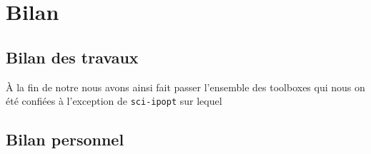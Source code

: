 \section{Bilan}

\subsection{Bilan des travaux}
\`A la fin de notre nous avons ainsi fait passer l’ensemble des toolboxes
qui nous on été confiées \`a l’exception de {\tt sci-ipopt} sur lequel

\subsection{Bilan personnel}

